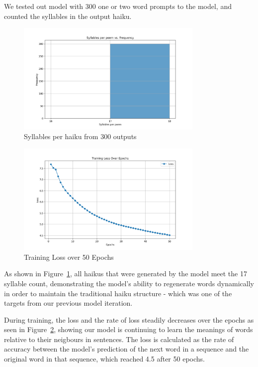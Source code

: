 \documentclass{article} %
\begin{document}
We tested out model with 300 one or two word prompts to the model, and counted the syllables in the output haiku.

\begin{figure}[h]
  \begin{center}
  \includegraphics[width=0.8\textwidth]{Figs/syllable_count_last_word-1.png}
  \end{center}
  \caption{Syllables per haiku from 300 outputs}
  \label{fig:plot1}
\end{figure}

\begin{figure}[h]
  \begin{center}
  \includegraphics[width=0.8\textwidth]{Figs/loss-vs-epochs-2.png}
  \end{center}
  \caption{Training Loss over 50 Epochs}
  \label{fig:lossvepochs}
\end{figure}

As shown in Figure~\ref{fig:plot1}, all haikus that were generated by the model meet the 17 syllable count, 
demonstrating the model’s ability to regenerate words dynamically in order to maintain the traditional haiku structure - which was one of the targets from our previous model iteration.

During training, the loss and the rate of loss steadily decreases over the epochs as seen in Figure~\ref{fig:lossvepochs}, showing our model is continuing to learn the meanings of words relative to their neigbours in sentences. 
The loss is calculated as the rate of accuracy between the model's prediction of the next word in a sequence and the original word in that sequence, which reached 4.5 after 50 epochs.
\end{document}

